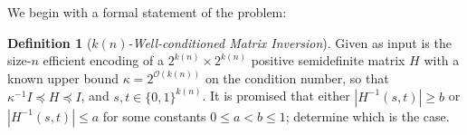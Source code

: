 \documentclass[11pt]{article}
\newtheorem{theorem}{Theorem}
\theoremstyle{definition}
\newtheorem{definition}[theorem]{Definition}
\theoremstyle{remark}
\newcommand\matrixinvert[1]{{\ensuremath{#1}}\textit{-Well-conditioned Matrix Inversion}}
\newcommand{\classfont}{\sf}
\newcommand{\Unitary}{\mathbf{U}}
\newcommand{\unitaryBQSPACE}[1]{{\classfont{BQ}_\Unitary\classfont{SPACE}}[#1]}
\DeclareMathOperator{\poly}{poly}
\begin{document}

We begin with a formal statement of the problem:
\begin{definition}[\matrixinvert{k(n)}] \label{def: matrix invert}
Given as input is the size-$n$ efficient encoding of a $2^{k(n)} \times 2^{k(n)}$ positive semidefinite matrix $H$ with a known upper bound $\kappa = 2^{\mathcal{O}(k(n))}$ on the condition number, so that $\kappa^{-1}I\preceq H \preceq I$, and $s,t\in \lbrace 0,1\rbrace^{k(n)}$. It is promised that either $|H^{-1}(s,t)|\geq b$
 or $|H^{-1}(s,t)|\leq a$ for some constants $0 \le a < b \le 1$; determine which is the case.
 \end{definition}
\end{document}
